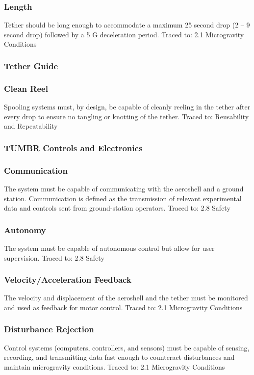 \subsubsection*{Length}
\indent\indent Tether should be long enough to accommodate a maximum 25 second drop (2 – 9 second drop) followed by a 5 G deceleration period. Traced to: 2.1 Microgravity Conditions

\subsubsection{Tether Guide}

\subsubsection*{Clean Reel}
\indent\indent Spooling systems must, by design, be capable of cleanly reeling in the tether after every drop to ensure no tangling or knotting of the tether. Traced to: Reusability and Repeatability

\subsubsection{TUMBR Controls and Electronics}

\subsubsection*{Communication}
\indent\indent The system must be capable of communicating with the aeroshell and a ground station. Communication is defined as the transmission of relevant experimental data and controls sent from ground-station operators. Traced to: 2.8 Safety

\subsubsection*{Autonomy}
\indent\indent The system must be capable of autonomous control but allow for user supervision. Traced to: 2.8 Safety

\subsubsection*{Velocity/Acceleration Feedback}
\indent\indent The velocity and displacement of the aeroshell and the tether must be monitored and used as feedback for motor control. Traced to: 2.1 Microgravity Conditions

\subsubsection*{Disturbance Rejection}
\indent\indent Control systems (computers, controllers, and sensors) must be capable of sensing, recording, and transmitting data fast enough to counteract disturbances and maintain microgravity conditions. Traced to: 2.1 Microgravity Conditions

